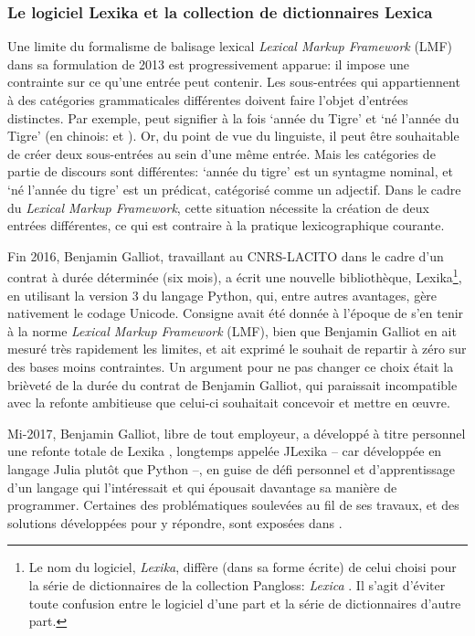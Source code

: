 \subsubsection{Le logiciel Lexika et la collection de dictionnaires Lexica}

Une limite du formalisme de balisage lexical \emph{Lexical Markup Framework} (LMF) dans sa formulation de 2013 est progressivement apparue: il impose une contrainte sur ce qu'une entrée peut contenir. Les sous-entrées qui appartiennent à des catégories grammaticales différentes doivent faire l'objet d'entrées distinctes. Par exemple,  peut signifier à la fois ‘année du Tigre’ et ‘né l'année du Tigre’ (en chinois:  et ). Or, du point de vue du linguiste, il peut être souhaitable de créer deux sous-entrées au sein d'une même entrée. Mais les catégories de partie de discours sont différentes: ‘année du tigre’ est un syntagme nominal, et ‘né l'année du tigre’ est un prédicat, catégorisé comme un adjectif. Dans le cadre du \emph{Lexical Markup Framework}, cette situation nécessite la création de deux entrées différentes, ce qui est contraire à la pratique lexicographique courante.

Fin 2016, Benjamin Galliot, travaillant au CNRS-LACITO dans le cadre d'un contrat à durée déterminée (six mois), a écrit une nouvelle bibliothèque, Lexika\footnote{Le nom du logiciel, \emph{Lexika}, diffère (dans sa forme écrite) de celui choisi pour la série de dictionnaires de la collection Pangloss: \emph{Lexica} \parencite{lexica2017}. Il s'agit d'éviter toute confusion entre le logiciel d'une part et la série de dictionnaires d'autre part.}, en utilisant la version 3 du langage Python, qui, entre autres avantages, gère nativement le codage Unicode. Consigne avait été donnée à l'époque de s'en tenir à la norme \emph{Lexical Markup Framework} (LMF), bien que Benjamin Galliot en ait mesuré très rapidement les limites, et ait exprimé le souhait de repartir à zéro sur des bases moins contraintes. Un argument pour ne pas changer ce choix était la brièveté de la durée du contrat de Benjamin Galliot, qui paraissait incompatible avec la refonte ambitieuse que celui-ci souhaitait concevoir et mettre en œuvre.

Mi-2017, Benjamin Galliot, libre de tout employeur, a développé à titre personnel une refonte totale de Lexika \parencite{galliot:2017:lexika}, longtemps appelée JLexika – car développée en langage Julia plutôt que Python –, en guise de défi personnel et d’apprentissage d’un langage qui l’intéressait et qui épousait davantage sa manière de programmer. Certaines des problématiques soulevées au fil de ses travaux, et des solutions développées pour y répondre, sont exposées dans \cite{galliot:2023:lexikaproblématiques}.


